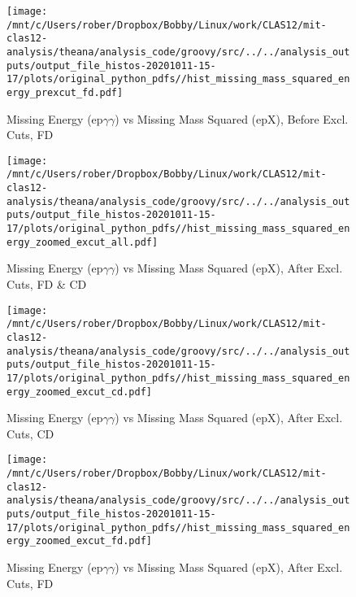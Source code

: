 \documentclass{article}
\begin{document}
\begin{landscape}
    \begin{figure}[h]
        \centering

        \texttt{[image: /mnt/c/Users/rober/Dropbox/Bobby/Linux/work/CLAS12/mit-clas12-analysis/theana/analysis\_code/groovy/src/../../analysis\_outputs/output\_file\_histos-20201011-15-17/plots/original\_python\_pdfs//hist\_missing\_mass\_squared\_energy\_prexcut\_fd.pdf]}
        \captionsetup{textformat=empty,labelformat=blank}
        \caption{Missing Energy (ep$\gamma$$\gamma$) vs Missing Mass Squared (epX), Before Excl. Cuts, FD}
    \end{figure}
    \clearpage
    
    \begin{figure}[h]
        \centering

        \texttt{[image: /mnt/c/Users/rober/Dropbox/Bobby/Linux/work/CLAS12/mit-clas12-analysis/theana/analysis\_code/groovy/src/../../analysis\_outputs/output\_file\_histos-20201011-15-17/plots/original\_python\_pdfs//hist\_missing\_mass\_squared\_energy\_zoomed\_excut\_all.pdf]}
        \captionsetup{textformat=empty,labelformat=blank}
        \caption{Missing Energy (ep$\gamma$$\gamma$) vs Missing Mass Squared (epX), After Excl. Cuts, FD \& CD}
    \end{figure}
    \clearpage
    
    \begin{figure}[h]
        \centering

        \texttt{[image: /mnt/c/Users/rober/Dropbox/Bobby/Linux/work/CLAS12/mit-clas12-analysis/theana/analysis\_code/groovy/src/../../analysis\_outputs/output\_file\_histos-20201011-15-17/plots/original\_python\_pdfs//hist\_missing\_mass\_squared\_energy\_zoomed\_excut\_cd.pdf]}
        \captionsetup{textformat=empty,labelformat=blank}
        \caption{Missing Energy (ep$\gamma$$\gamma$) vs Missing Mass Squared (epX), After Excl. Cuts, CD}
    \end{figure}
    \clearpage
    
    \begin{figure}[h]
        \centering

        \texttt{[image: /mnt/c/Users/rober/Dropbox/Bobby/Linux/work/CLAS12/mit-clas12-analysis/theana/analysis\_code/groovy/src/../../analysis\_outputs/output\_file\_histos-20201011-15-17/plots/original\_python\_pdfs//hist\_missing\_mass\_squared\_energy\_zoomed\_excut\_fd.pdf]}
        \captionsetup{textformat=empty,labelformat=blank}
        \caption{Missing Energy (ep$\gamma$$\gamma$) vs Missing Mass Squared (epX), After Excl. Cuts, FD}
    \end{figure}
    \clearpage
    

\end{landscape}
\end{document}
